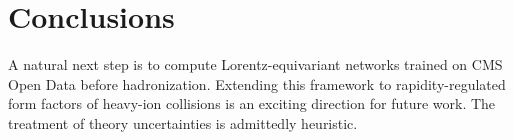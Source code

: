 \section{Conclusions}\label{sec:conclusions}

A natural next step is to compute Lorentz-equivariant networks trained
on CMS Open Data before hadronization. Extending this framework to
rapidity-regulated form factors of heavy-ion collisions is an exciting
direction for future work. The treatment of theory uncertainties is
admittedly heuristic.

